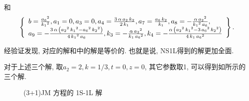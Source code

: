 和
\begin{equation}
\def\arraystretch{1.2}
\left\{
\begin{array}{l}  
b=\frac{{{{a}_{6}}}^{2}}{{{{k}_{1}}}^{2}},
{{a}_{1}}=0,
{{a}_{3}}=0,
{{a}_{4}}=\frac{3\,\alpha\,{{a}_{2}}\,{{k}_{2}}}{2\,{{k}_{1}}},
{{a}_{7}}=\frac{{{a}_{6}}\,{{k}_{2}}}{{{k}_{1}}},
{{a}_{8}}=-\frac{\alpha\,{{{a}_{2}}}^{2}}{{{{k}_{1}}}^{2}\,{{a}_{6}}},\\
{{a}_{9}}=-\frac{3\,\alpha\,\left( {{{a}_{2}}}^{2}\,{{{k}_{1}}}^{2}-{{{a}_{6}}}^{2}\,{{{k}_{2}}}^{2}\right) }{4\,{{{k}_{1}}}^{2}\,{{a}_{6}}},
{{k}_{3}}=-\frac{\alpha\,{{{a}_{2}}}^{2}}{{{k}_{1}}\,{{{a}_{6}}}^{2}},
{{k}_{4}}=-\frac{\alpha\,\left( {{{a}_{2}}}^{2}\,{{{k}_{1}}}^{2}-3\,{{{a}_{6}}}^{2}\,{{{k}_{2}}}^{2}\right) }{4\,{{k}_{1}}\,{{{a}_{6}}}^{2}}
\end{array}
\right\}. \label{1S1L-3}
\end{equation}

经验证发现, 对应的解和中的解是等价的. 也就是说, NS1L得到的解更加全面. 

对于上述三个解, 取$a_2=2,k=1/3,t=0,z=0$, 其它参数取1, 可以得到如所示的三个解. 

\begin{figure}[htbp]
\centering
{}
\caption{(3+1)JM 方程的 1S-1L 解} \label{fig-1S1L}
\end{figure}


